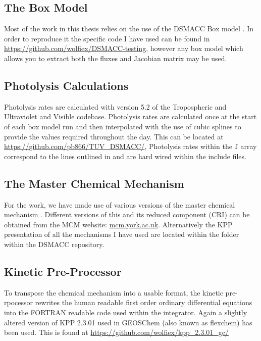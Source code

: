 \subsection*{The Box Model}

Most of the work in this thesis relies on the use of the DSMACC Box model \citep{dsmacc}. In order to reproduce it the specific code I have used can be found in \url{https://github.com/wolfiex/DSMACC-testing}, however any box model which allows you to extract both the fluxes and Jacobian matrix may be used.

\subsection*{Photolysis Calculations}

Photolysis rates are calculated with version 5.2 of the Tropospheric and Ultraviolet and Visible codebase. Photolysis rates are calculated once at the start of each box model run and then interpolated with the use of cubic splines to provide the values required throughout the day. This can be located at \url{https://github.com/pb866/TUV_DSMACC/}, Photolysis rates within the J array correspond to the lines outlined in  and are hard wired within the  include files.

\subsection*{The Master Chemical Mechanism}
For the work, we have made use of various versions of the master chemical mechanism \citep{mcm}. Different versions of this and its reduced component (CRI) can be obtained from the MCM website: \url{mcm.york.ac.uk}. Alternatively the KPP presentation of all the mechanisms I have used are located within the  folder within the DSMACC repository.


\subsection*{Kinetic Pre-Processor}
To transpose the chemical mechanism into a usable format, the kinetic pre-rpocessor rewrites the human readable first order ordinary differential equations into the FORTRAN readable code used within the integrator. Again a slightly altered version of KPP 2.3.01 used in GEOSChem (also known as flexchem) has been used. This is found at \url{https://github.com/wolfiex/kpp_2.3.01_gc/}

